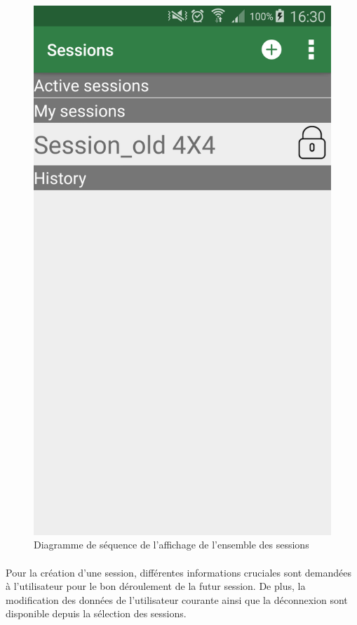 \documentclass[titlepage, 12pt]{report}
\begin{document}
\begin{figure}[!h]
	\caption{Diagramme de séquence de l'affichage de l'ensemble des sessions}
	\label{screenshots_list_session}
	\centering
	\includegraphics[scale=0.2]{Images/screenshots/list_sessions.png}
\end{figure}

\clearpage

\paragraph{}Pour la création d'une session, différentes informations cruciales sont demandées à l'utilisateur pour le bon déroulement de la futur session.
De plus, la modification des données de l'utilisateur courante ainsi que la déconnexion sont disponible depuis la sélection des sessions.
\end{document}
